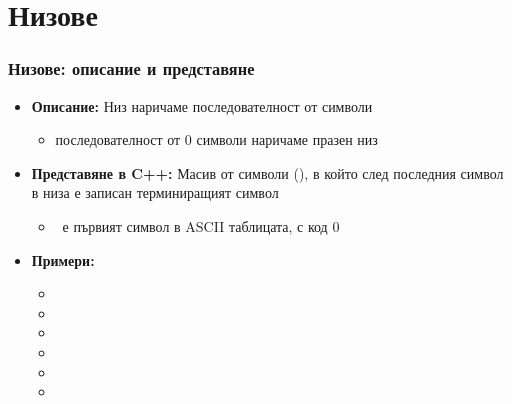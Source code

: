 \documentclass{beamer}
\begin{document}
\section{Низове}

\newcommand{\s}{<низ>\xspace}
\renewcommand{\ss}[1]{<низ$_{#1}$>\xspace}
\xspaceaddexceptions{\tta}
\renewcommand{\b}{<буфер>\xspace}

\begin{frame}
  \frametitle{Низове: описание и представяне}

  \begin{itemize}[<+->]
  \item \textbf{Описание:} \alert{Низ} наричаме последователност от символи
    \begin{itemize}
    \item последователност от 0 символи наричаме \alert{празен низ}
    \end{itemize}
  \item \textbf{Представяне в C++:} Масив от символи (), в който след последния символ в низа е записан \alert{терминиращият символ} \term
    \begin{itemize}
    \item \term\ е първият символ в ASCII таблицата, с код 0
    \end{itemize}
  \item \textbf{Примери:}
    \begin{itemize}
    \item {}
    \item {}
    \item {}
    \item {}
    \item {}
    \item {}
    \end{itemize}
  \end{itemize}
\end{frame}
\end{document}
